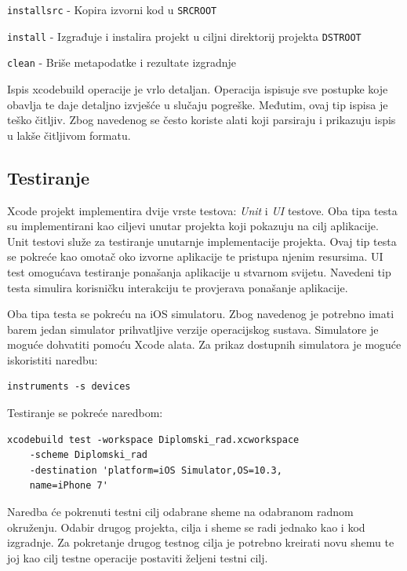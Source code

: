 \documentclass[times, utf8, diplomski, numeric]{fer}
\begin{document}
\begin{appendices}
\verb|installsrc| - Kopira izvorni kod u \verb|SRCROOT|

\verb|install| - Izgrađuje i instalira projekt u ciljni direktorij projekta \verb|DSTROOT|

\verb|clean| - Briše metapodatke i rezultate izgradnje

Ispis xcodebuild operacije je vrlo detaljan. Operacija ispisuje sve postupke koje obavlja te daje detaljno izvješće u slučaju pogreške. Međutim, ovaj tip ispisa je teško čitljiv. Zbog navedenog se često koriste alati koji parsiraju i prikazuju ispis u lakše čitljivom formatu.

\subsection{Testiranje} \label{TestiranjeXcodeBuild}

Xcode projekt implementira dvije vrste testova: \textit{Unit} i \textit{UI} testove. Oba tipa testa su implementirani kao ciljevi unutar projekta koji pokazuju na cilj aplikacije. Unit testovi služe za testiranje unutarnje implementacije projekta. Ovaj tip testa se pokreće kao omotač oko izvorne aplikacije te pristupa njenim resursima. UI test omogućava testiranje ponašanja aplikacije u stvarnom svijetu. Navedeni tip testa simulira korisničku interakciju te provjerava ponašanje aplikacije.

Oba tipa testa se pokreću na iOS simulatoru. Zbog navedenog je potrebno imati barem jedan simulator prihvatljive verzije operacijskog sustava. Simulatore je moguće dohvatiti pomoću Xcode alata. Za prikaz dostupnih simulatora je moguće iskoristiti naredbu:

\begin{verbatim}
instruments -s devices
\end{verbatim}

Testiranje se pokreće naredbom:

\begin{verbatim}
xcodebuild test -workspace Diplomski_rad.xcworkspace
    -scheme Diplomski_rad
    -destination 'platform=iOS Simulator,OS=10.3,
    name=iPhone 7'
\end{verbatim}

Naredba će pokrenuti testni cilj odabrane sheme na odabranom radnom okruženju. Odabir drugog projekta, cilja i sheme se radi jednako kao i kod izgradnje. Za pokretanje drugog testnog cilja je potrebno kreirati novu shemu te joj kao cilj testne operacije postaviti željeni testni cilj.


\end{appendices}
\end{document}
